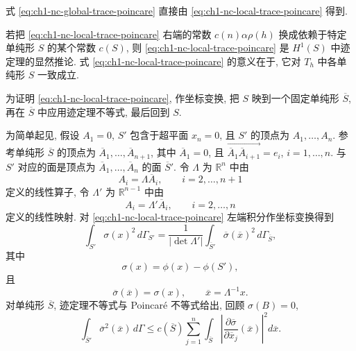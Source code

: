 \begin{Proof}
式 \eqref{eq:ch1-nc-global-trace-poincare} 直接由 \eqref{eq:ch1-nc-local-trace-poincare} 得到.

若把 \eqref{eq:ch1-nc-local-trace-poincare} 右端的常数 $c(n)\alpha\rho(h)$ 换成依赖于特定单纯形 $S$ 的某个常数 $c(S)$, 则 \eqref{eq:ch1-nc-local-trace-poincare} 是 $H^1(S)$ 中迹定理的显然推论. 式 \eqref{eq:ch1-nc-local-trace-poincare} 的意义在于, 它对 $T_h$ 中各单纯形 $S$ 一致成立.

为证明 \eqref{eq:ch1-nc-local-trace-poincare}, 作坐标变换, 把 $S$ 映到一个固定单纯形 $\overline S$, 再在 $\overline S$ 中应用迹定理不等式, 最后回到 $S$.

为简单起见, 假设 $A_1=0$, $S'$ 包含于超平面 $x_n=0$, 且 $S'$ 的顶点为 $A_1,\ldots,A_n$. 参考单纯形 $\overline S$ 的顶点为 $\overline A_1,\ldots,\overline A_{n+1}$, 其中 $\overline A_1=0$, 且 $\overrightarrow{\overline A_1\overline A_{i+1}}=e_i$, $i=1,\ldots,n$. 与 $S'$ 对应的面是顶点为 $\overline A_1,\ldots,\overline A_n$ 的面 $\overline S'$. 令 $\Lambda$ 为 $\mathbb R^n$ 中由
\[
A_i=\Lambda\overline A_i,
\qquad i=2,\ldots,n+1
\]
定义的线性算子, 令 $\Lambda'$ 为 $\mathbb R^{n-1}$ 中由
\[
A_i=\Lambda'\overline A_i,
\qquad i=2,\ldots,n
\]
定义的线性映射. 对 \eqref{eq:ch1-nc-local-trace-poincare} 左端积分作坐标变换得到
\[
\int_{S'}\sigma(x)^2\,d\Gamma_{S'}
=\frac1{|\det\Lambda'|}\int_{\overline S'}\overline\sigma(\overline x)^2\,d\Gamma_{\overline S},
\]
其中
\begin{equation}
\sigma(x)=\phi(x)-\phi(S'),
\label{eq:ch1-nc-trace-sigma}
\end{equation}
且
\begin{equation}
\overline\sigma(\overline x)=\sigma(x),
\qquad\overline x=\Lambda^{-1}x.
\label{eq:ch1-nc-trace-pullback}
\end{equation}
对单纯形 $\overline S$, 迹定理不等式与 Poincaré 不等式给出, 回顾 $\sigma(B)=0$,
\[
\int_{\overline S'}\overline\sigma^2(\overline x)\,d\Gamma
\leq c(\overline S)\sum_{j=1}^n
\int_{\overline S}\left|\frac{\partial\overline\sigma}{\partial\overline x_j}(\overline x)\right|^2d\overline x.
\]


\end{Proof}
